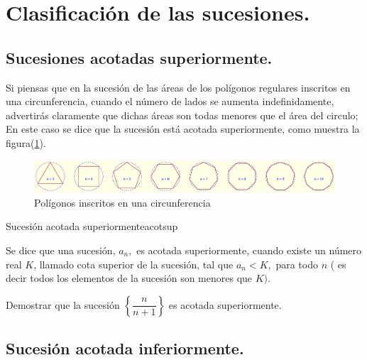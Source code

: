 \documentclass[oneside,english,spanish,2m,twoside,svgnames,x11names,HTML,twoside,12pt]{libro-matua}\usepackage[]{graphicx}\usepackage[]{color}
\begin{document}
\section{Clasificación de las sucesiones.}

\subsection{Sucesiones acotadas superiormente.}

\begin{ejemplo}

Si piensas que en la sucesión de las áreas de los polígonos regulares
inscritos en una circunferencia, cuando el número de lados se aumenta
indefinidamente, advertirás claramente que dichas áreas son todas
menores que el área del circulo; En este caso se dice que la sucesión
está acotada superiormente, como muestra la figura(\ref{fig:poligono}).

\begin{figure}[H]
\centering\includegraphics[scale=0.5]{0_home_antalcides_MEGA_calculo_I_libro_pdf_poligonos.pdf}\caption{Polígonos inscritos en una circunferencia}\label{fig:poligono}
\end{figure}

\end{ejemplo}

\begin{defi}{Sucesión acotada superiormente}{acotsup}

Se dice que una sucesión, $a_{n},$ es acotada superiormente, cuando
existe un número real $K$, llamado cota superior de la sucesión,
tal que $a_{n}<K,$ para todo $n$ ( es decir todos los elementos
de la sucesión son menores que $K).$ 

\end{defi}

\begin{ejercicio}

Demostrar que la sucesión $\left\{ \dfrac{n}{n+1}\right\} $ es acotada
superiormente.

\end{ejercicio}

\subsection{Sucesión acotada inferiormente.}
\end{document}
